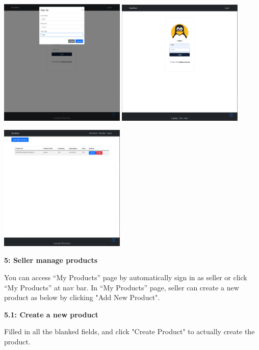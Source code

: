 \documentclass[12pt]{article}
\begin{document}
\includegraphics[width=0.45\textwidth]{UserGuideImage/6.png}
\includegraphics[width=0.45\textwidth]{UserGuideImage/7.png}


\includegraphics[width=0.45\textwidth]{UserGuideImage/8.png}

\newpage
\textbf{5: Seller manage products}

You can access “My Products” page by automatically sign in as seller or click “My Products”
at nav bar. In “My Products” page, seller can create a new product as below by clicking "Add New Product".

\vspace*{5mm}
\hspace*{5mm}\textbf{5.1: Create a new product}

Filled in all the blanked fields, and click "Create Product" to actually create the product.
\end{document}
